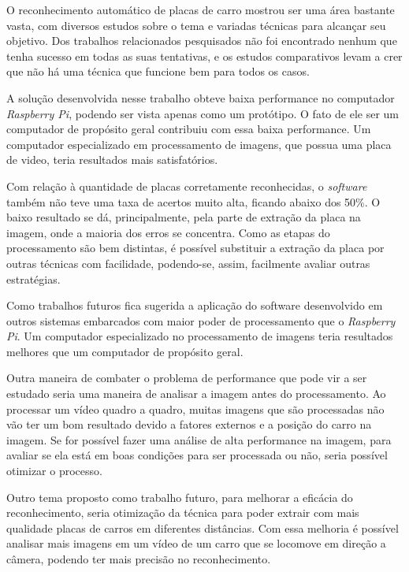 O reconhecimento automático de placas de carro mostrou ser uma área bastante
vasta, com diversos estudos sobre o tema e variadas técnicas para alcançar seu
objetivo. Dos trabalhos relacionados pesquisados não foi encontrado nenhum que
tenha sucesso em todas as suas tentativas, e os estudos comparativos levam a
crer que não há uma técnica que funcione bem para todos os casos. 

A solução desenvolvida nesse trabalho obteve baixa performance no computador
\emph{Raspberry Pi}, podendo ser vista apenas como um protótipo. O fato de ele
ser um computador de propósito geral contribuiu com essa baixa performance. Um
computador especializado em processamento de imagens, que possua uma placa de
video, teria resultados mais satisfatórios.

Com relação à quantidade de placas corretamente reconhecidas, o \emph{software}
também não teve uma taxa de acertos muito alta, ficando abaixo dos 50\%. O baixo
resultado se dá, principalmente, pela parte de extração da placa na imagem, onde
a maioria dos erros se concentra. Como as etapas do processamento são bem
distintas, é possível substituir a extração da placa por outras técnicas com
facilidade, podendo-se, assim, facilmente avaliar outras estratégias.

Como trabalhos futuros fica sugerida a aplicação do software desenvolvido em
outros sistemas embarcados com maior poder de processamento que o
\emph{Raspberry Pi}. Um computador especializado no processamento de imagens
teria resultados melhores que um computador de propósito geral.

Outra maneira de combater o problema de performance que pode vir a ser estudado
seria uma maneira de analisar a imagem antes do processamento. Ao processar um
vídeo quadro a quadro, muitas imagens que são processadas não vão ter um bom
resultado devido a fatores externos e a posição do carro na imagem. Se for
possível fazer uma análise de alta performance na imagem, para avaliar se ela
está em boas condições para ser processada ou não, seria possível otimizar o
processo. 

Outro tema proposto como trabalho futuro, para melhorar a eficácia do
reconhecimento, seria otimização da técnica para poder extrair com mais
qualidade placas de carros em diferentes distâncias. Com essa melhoria é
possível analisar mais imagens em um vídeo de um carro que se locomove em
direção a câmera, podendo ter mais precisão no reconhecimento.
